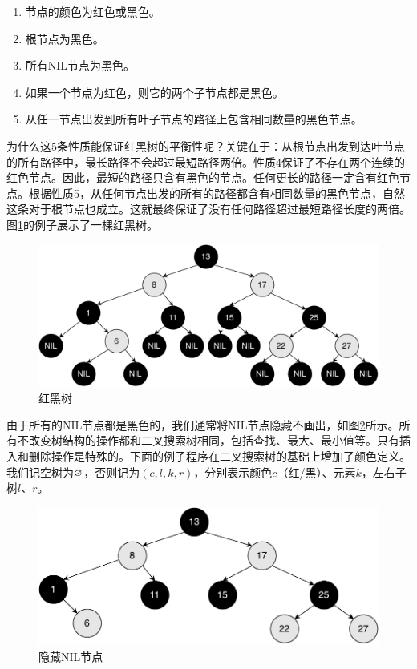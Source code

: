 \documentclass[b5paper]{ctexart}
\begin{document}
\begin{enumerate}
\item 节点的颜色为红色或黑色。
\item 根节点为黑色。
\item 所有NIL节点为黑色。
\item 如果一个节点为红色，则它的两个子节点都是黑色。
\item 从任一节点出发到所有叶子节点的路径上包含相同数量的黑色节点。
\end{enumerate}

为什么这5条性质能保证红黑树的平衡性呢？关键在于：从根节点出发到达叶节点的所有路径中，最长路径不会超过最短路径两倍。性质4保证了不存在两个连续的红色节点。因此，最短的路径只含有黑色的节点。任何更长的路径一定含有红色节点。根据性质5，从任何节点出发的所有的路径都含有相同数量的黑色节点，自然这条对于根节点也成立。这就最终保证了没有任何路径超过最短路径长度的两倍\cite{wiki-rbt}。图\ref{fig:rbt-example-with-nil}的例子展示了一棵红黑树。

\begin{figure}[htbp]
  \centering
  \includegraphics[scale=0.35]{img/rbt-example-with-nil}
  \caption{红黑树}
  \label{fig:rbt-example-with-nil}
\end{figure}

由于所有的NIL节点都是黑色的，我们通常将NIL节点隐藏不画出，如图\ref{fig:rbt-example}所示。所有不改变树结构的操作都和二叉搜索树相同，包括查找、最大、最小值等。只有插入和删除操作是特殊的。下面的例子程序在二叉搜索树的基础上增加了颜色定义。我们记空树为$\varnothing$，否则记为$(c, l, k, r)$，分别表示颜色$c$（红/黑）、元素$k$，左右子树$l$、$r$。

\begin{figure}[htbp]
  \centering
  \includegraphics[scale=0.4]{img/rbt-example}
  \caption{隐藏NIL节点}
  \label{fig:rbt-example}
\end{figure}
\end{document}

